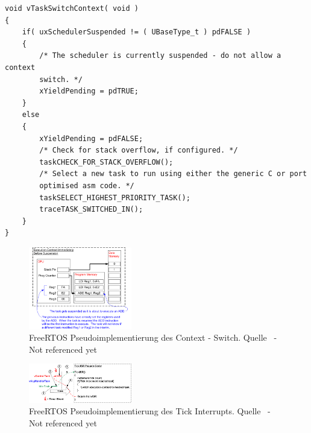 \begin{lstlisting}[caption={Implementierung von Kontextwechsel aus Task.c}, linewidth=8cm,captionpos=b, label=lst:taskSwitch, float=hbt]
void vTaskSwitchContext( void )
{
	if( uxSchedulerSuspended != ( UBaseType_t ) pdFALSE )
	{
		/* The scheduler is currently suspended - do not allow a context
		switch. */
		xYieldPending = pdTRUE;
	}
	else
	{
		xYieldPending = pdFALSE;
		/* Check for stack overflow, if configured. */
		taskCHECK_FOR_STACK_OVERFLOW();
		/* Select a new task to run using either the generic C or port
		optimised asm code. */
		taskSELECT_HIGHEST_PRIORITY_TASK();
		traceTASK_SWITCHED_IN();
	}
}
\end{lstlisting}



\begin{figure}[ht!]
	\centering
		\includegraphics[width=0.4\textwidth]{Pictures/FreeRTOSOrg/ExeContext.png}
	\caption{FreeRTOS Pseudoimplementierung des Context - Switch. Quelle~\protect{} - Not referenced yet}
	\label{fig:FreeRTOSFsm}
	
\end{figure}

\begin{figure}[ht!]
	\centering
		\includegraphics[width=0.4\textwidth]{Pictures/FreeRTOSOrg/TickISR.png}
	\caption{FreeRTOS Pseudoimplementierung des Tick Interrupts. Quelle~\protect{} - Not referenced yet}
	\label{fig:FreeRTOSFsm}
\end{figure}